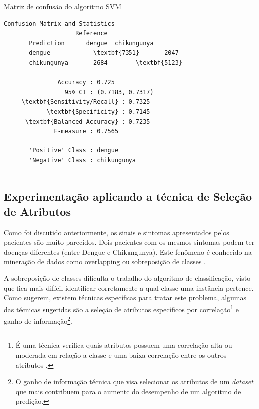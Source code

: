 \begin{quadro}
\caption{\label{quadro:svm1}Matriz de confusão do algoritmo SVM}
\begingroup
    \fontsize{10pt}{9pt}\selectfont
    \begin{Verbatim}[commandchars=\\\{\}]
      Confusion Matrix and Statistics
                    Reference
       Prediction      dengue  chikungunya
       dengue            \textbf{7351}       2047
       chikungunya       2684        \textbf{5123}
                                         
               Accuracy : 0.725         
                 95% CI : (0.7183, 0.7317) 
     \textbf{Sensitivity/Recall} : 0.7325         
            \textbf{Specificity} : 0.7145         
      \textbf{Balanced Accuracy} : 0.7235
              F-measure : 0.7565        
         
       'Positive' Class : dengue 
       'Negative' Class : chikungunya
  
    \end{Verbatim}  
\endgroup
{}
\end{quadro}


\subsection{Experimentação aplicando a técnica de Seleção de Atributos}

Como foi discutido anteriormente, os sinais e sintomas apresentados pelos pacientes são muito parecidos. Dois pacientes com os mesmos sintomas podem ter doenças diferentes (entre Dengue e Chikungunya). Este fenômeno é conhecido na mineração de dados como overlapping ou sobreposição de classes \cite{xiong2010classification}.

A sobreposição de classes dificulta o trabalho do algoritmo de classificação, visto que fica mais difícil identificar corretamente a qual classe uma instância pertence. Como  sugerem, existem técnicas específicas para tratar este problema, algumas das técnicas sugeridas são a seleção de atributos específicos por correlação\footnote{É uma técnica verifica quais atributos possuem uma correlação alta ou moderada em relação a classe e uma baixa correlação entre os outros atributos .} e ganho de informação\footnote{O ganho de informação técnica que visa selecionar os atributos de um \textit{dataset} que mais contribuem para o aumento do desempenho de um algoritmo de predição.}.


